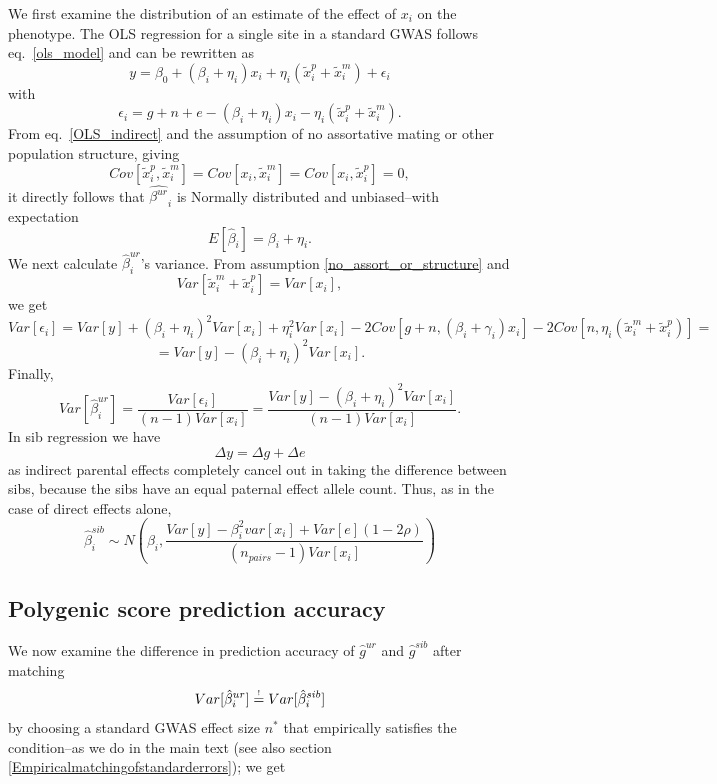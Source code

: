 \documentclass[hidelinks, 12pt]{article}
\begin{document}
We first examine the distribution of an estimate of the effect of $x_i$ on the phenotype.  The OLS regression for a single site in a standard GWAS follows eq.~\ref{ols_model} and can be rewritten as
\begin{equation}
\label{OLS_indirect}
y=\beta_0+(\beta_i+\eta_i)x_i+\eta_i(\tilde{x}_i^p+\tilde{x}_i^m)+\epsilon_i
\end{equation}
with
$$\epsilon_i=g+n+e-(\beta_i+\eta_i)x_i-\eta_i(\tilde{x}_i^p+\tilde{x}_i^m).$$
From eq.~\ref{OLS_indirect} and the assumption of no assortative mating or other population structure, giving 
\begin{equation}
\label{no_assort_or_structure}
Cov[\tilde{x}_i^p,\tilde{x}_i^m]=Cov[x_i,\tilde{x}_i^m]=Cov[x_i,\tilde{x}_i^p]=0,
\end{equation}
it directly follows that $\hat{\beta^{ur}}_i$ is Normally distributed and unbiased--with expectation 
$$E[\hat{\beta}_i]=\beta_i+\eta_i.$$
We next calculate $\hat{\beta}_i^{ur}$'s variance. From assumption \ref{no_assort_or_structure} and 
$$Var[\tilde{x}_i^m+\tilde{x}_i^p]=Var[x_i],$$
we get
$$Var[\epsilon_i]=Var[y]+(\beta_i+\eta_i)^2Var[x_i]+\eta_i^2Var[x_i]-2Cov[g+n,(\beta_i+\gamma_i)x_i]-2Cov[n,\eta_i(\tilde{x}_i^m+\tilde{x}_i^p)]=$$
$$=Var[y]-(\beta_i+\eta_i)^2Var[x_i].$$
Finally,
$$Var[\hat{\beta}_i^{ur}]=\frac{Var[\epsilon_i]}{(n-1)Var[x_i]}=\frac{Var[y]-(\beta_i+\eta_i)^2Var[x_i]}{(n-1)Var[x_i]}.$$
In sib regression we have
$$\Delta y=\Delta g+\Delta e$$
as indirect parental effects completely cancel out in taking the difference between sibs, because the sibs have an equal paternal effect allele count. Thus, as in the case of direct effects alone, 
$$\hat{\beta}_i^{sib} \sim N(\beta_i,\frac{Var[y] - \beta_i^2var[x_i] + Var[e](1-2\rho)}{(n_{pairs}-1) Var[x_i]})$$

\subsection{Polygenic score prediction accuracy}
We now examine the difference in prediction accuracy of $\hat{g}^{ur}$ and $\hat{g}^{sib}$ after matching 
\begin{equation}
\label{matching_errors_indirect}
Var[\hat{\beta}_i^{ur}] \reqeq Var[\hat{\beta}_i^{sib}]
\end{equation}
by choosing a standard GWAS effect size $n^*$ that empirically satisfies the condition--as we do in the main text (see also section \ref{Empiricalmatchingofstandarderrors}); we get
\end{document}
